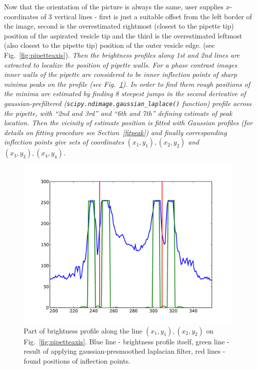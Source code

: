 Now that the orientation of the picture is always the same, user supplies $x$-coordinates of 3 vertical lines - first is just a suitable offset from the left border of the image, second is the overestimated rightmost (closest to the pipette tip) position of the aspirated vesicle tip and the third is the overestimated leftmost (also closest to the pipette tip) position of the outer vesicle edge. (see Fig.~\ref{fig:pipetteaxis}). \textsl{Then the brightness profiles along 1st and 2nd lines are extracted to localize the position of pipette walls. For a phase contrast images inner walls of the pipette are considered to be inner inflection points of sharp minima peaks on the profile (see Fig.~\ref{fig:pipetteprofile}). In order to find them rough positions of the minima are estimated by finding 8 steepest jumps in the second derivative of gaussian-prefiltered (\verb|scipy.ndimage.gaussian_laplace()| function) profile across the pipette, with ``2nd and 3rd'' and ``6th and 7th'' defining estimate of peak location. Then the vicinity of estimate position is fitted with Gaussian profiles (for details on fitting procedure see Section~\ref{fitpeak}) and finally corresponding inflection points give sets of coordinates $(x_1,y_1), (x_2,y_2)$ and $(x_3,y_3), (x_4,y_4)$.}

\begin{figure}%
\includegraphics[width=\columnwidth]{figs/pipetteprofile.pdf}%
\caption{Part of brightness profile along the line $(x_1,y_1), (x_2,y_2)$ on Fig.~\ref{fig:pipetteaxis}. Blue line - brightness profile itself, green line - result of applying gaussian-presmoothed laplacian filter, red lines - found positions of inflection points.}%
\label{fig:pipetteprofile}%
\end{figure}

